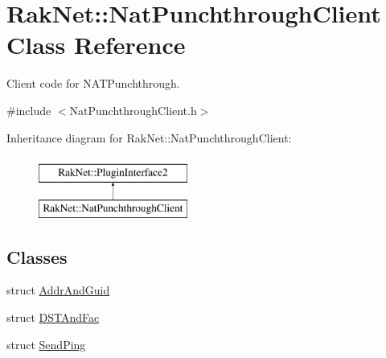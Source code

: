 \hypertarget{class_rak_net_1_1_nat_punchthrough_client}{\section{Rak\-Net\-:\-:Nat\-Punchthrough\-Client Class Reference}
\label{class_rak_net_1_1_nat_punchthrough_client}
}


Client code for N\-A\-T\-Punchthrough.  




{\ttfamily \#include $<$Nat\-Punchthrough\-Client.\-h$>$}

Inheritance diagram for Rak\-Net\-:\-:Nat\-Punchthrough\-Client\-:\begin{figure}[H]
\begin{center}
\leavevmode
\includegraphics[height=2.000000cm]{class_rak_net_1_1_nat_punchthrough_client}
\end{center}
\end{figure}
\subsection*{Classes}
\begin{DoxyCompactItemize}
\item 
struct \hyperlink{struct_rak_net_1_1_nat_punchthrough_client_1_1_addr_and_guid}{Addr\-And\-Guid}
\item 
struct \hyperlink{struct_rak_net_1_1_nat_punchthrough_client_1_1_d_s_t_and_fac}{D\-S\-T\-And\-Fac}
\item 
struct \hyperlink{struct_rak_net_1_1_nat_punchthrough_client_1_1_send_ping}{Send\-Ping}
\end{DoxyCompactItemize}
